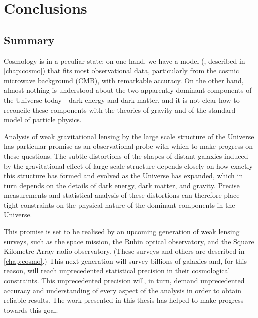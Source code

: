 
% 
% 

% 

\chapter{Conclusions}
\label{chap:conclusions}

\section{Summary}

Cosmology is in a peculiar state: on one hand, we have a model (\lcdm{}, described in \autoref{chap:cosmo}) that fits most observational data, particularly from the cosmic microwave background (CMB), with remarkable accuracy. On the other hand, almost nothing is understood about the two apparently dominant components of the Universe today---dark energy and dark matter, and it is not clear how to reconcile these components with the theories of gravity and of the standard model of particle physics.

Analysis of weak gravitational lensing by the large scale structure of the Universe has particular promise as an observational probe with which to make progress on these questions. The subtle distortions of the shapes of distant galaxies induced by the gravitational effect of large scale structure depends closely on how exactly this structure has formed and evolved as the Universe has expanded, which in turn depends on the details of dark energy, dark matter, and gravity. Precise measurements and statistical analysis of these distortions can therefore place tight constraints on the physical nature of the dominant components in the Universe.

This promise is set to be realised by an upcoming generation of weak lensing surveys, such as the \Euclid{} space mission, the Rubin optical observatory, and the Square Kilometre Array radio observatory. (These surveys and others are described in \autoref{chap:cosmo}.) This next generation will survey billions of galaxies and, for this reason, will reach unprecedented statistical precision in their cosmological constraints. This unprecedented precision will, in turn, demand unprecedented accuracy and understanding of every aspect of the analysis in order to obtain reliable results. The work presented in this thesis has helped to make progress towards this goal.

